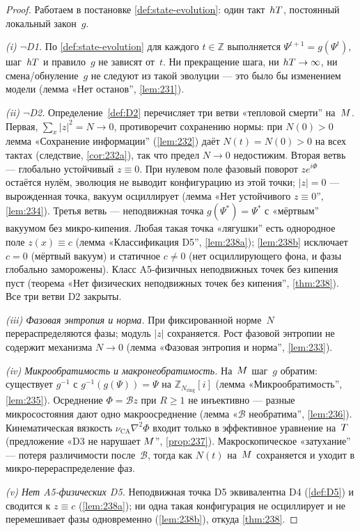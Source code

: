 \begin{proof}
Работаем в постановке \cref{def:state-evolution}: один такт~$hT$, постоянный локальный закон~$g$.

\smallskip
\emph{(i) $\neg$D1.}
По \cref{def:state-evolution} для каждого $t\in\mathbb{Z}$ выполняется $\Psi^{t+1}=g(\Psi^t)$,
шаг~$hT$ и правило~$g$ не зависят от~$t$.
Ни прекращение шага, ни $hT\to\infty$, ни смена/обнуление~$g$ не следуют из такой эволуции ---
это было бы изменением модели (лемма «Нет останов'', \ref{lem:231}).

\smallskip
\emph{(ii) $\neg$D2.}
Определение~\ref{def:D2} перечисляет три ветви «тепловой смерти'' на~$M$.
Первая, $\sum_x|z|^2=N\to 0$, противоречит сохранению нормы:
при $N(0)>0$ лемма «Сохранение информации'' (\ref{lem:232}) даёт $N(t)=N(0)>0$ на всех тактах
(следствие, \ref{cor:232a}), так что предел $N\to 0$ недостижим.
Вторая ветвь --- глобально устойчивый $z\equiv 0$.
При нулевом поле фазовый поворот $z e^{i\Phi}$ остаётся нулём, эволюция не выводит конфигурацию
из этой точки; $|z|=0$ --- вырожденная точка, вакуум осциллирует
(лемма «Нет устойчивого $z\equiv 0$'', \ref{lem:234}).
Третья ветвь --- неподвижная точка $g(\Psi^*)=\Psi^*$ с «мёртвым'' вакуумом без микро-кипения.
Любая такая точка «лягушки'' есть однородное поле $z(x)\equiv c$ (лемма «Классификация D5'', \ref{lem:238a});
\ref{lem:238b} исключает $c=0$ (мёртвый вакуум) и статичное $c\ne 0$
(нет осциллирующего фона, и фазы глобально заморожены).
Класс A5-физичных неподвижных точек без кипения пуст (теорема «Нет физических неподвижных точек без кипения'', \ref{thm:238}).
Все три ветви D2 закрыты.

\smallskip
\emph{(iii) Фазовая энтропия и норма.}
При фиксированной норме~$N$ перераспределяются фазы;
модуль $|z|$ сохраняется.
Рост фазовой энтропии не содержит механизма $N\to 0$ (лемма «Фазовая энтропия и норма'', \ref{lem:233}).

\smallskip
\emph{(iv) Микрообратимость и макронеобратимость.}
На~$M$ шаг~$g$ обратим: существует $g^{-1}$ с $g^{-1}(g(\Psi))=\Psi$
на $\mathbb{Z}_{N_{\mathrm{ring}}}[i]$ (лемма «Микрообратимость'', \ref{lem:235}).
Осреднение $\Phi=\mathcal{B}z$ при $R\ge 1$ не инъективно --- разные микросостояния дают одно макроосреднение
(лемма «$\mathcal{B}$ необратима'', \ref{lem:236}).
Кинематическая вязкость $\nu_{\mathrm{CA}}\nabla^2\Phi$ входит только в эффективное уравнение на~$T$
(предложение «D3 не нарушает $M$'', \ref{prop:237}). Макроскопическое «затухание'' --- потеря различимости после~$\mathcal{B}$,
тогда как $N(t)$ на~$M$ сохраняется и уходит в микро-перераспределение фаз.

\smallskip
\emph{(v) Нет A5-физических D5.}
Неподвижная точка D5 эквивалентна D4 (\ref{def:D5}) и сводится к $z\equiv c$ (\ref{lem:238a});
ни одна такая конфигурация не осциллирует и не перемешивает фазы одновременно (\ref{lem:238b}),
откуда \ref{thm:238}.
\end{proof}
